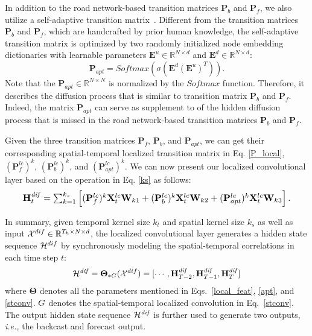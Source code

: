 \documentclass[sigconf, nonacm]{acmart}
\def\bb#1{\mathbb{#1}}
\def\b#1{\mathbf{#1}}
\def\cal#1{\mathcal{#1}}
\newcommand{\ie}{\textit{i.e.,}\xspace}
\begin{document}
In addition to the {\color{black}road network-based transition matrices $\mathbf{P}_b$ and $\mathbf{P}_f$}, we also utilize a self-adaptive {\color{black}transition} matrix~\cite{GWNet}.
{\color{black}
Different from the transition matrices $\mathbf{P}_b$ and $\mathbf{P}_f$, which are handcrafted by prior human knowledge, the self-adaptive transition matrix is optimized by two randomly initialized node embedding dictionaries with learnable parameters $\b{E}^u\in\mathbb{R}^{N\times d}$ and $\b{E}^d\in\mathbb{R}^{N\times d}$:
}
\begin{equation}
    \mathbf{P}_{\mathit{apt}}=\mathit{Softmax}(\sigma(\mathbf{E}^{d}(\mathbf{E}^{u})^T)).
    \label{apt}
\end{equation}
{\color{black}
Note that the $\mathbf{P}_{\mathit{apt}}\in\mathbb{R}^{N\times N}$ is normalized by the $\mathit{Softmax}$ function. 
Therefore, it describes the diffusion process that is similar to transition matrix $\mathbf{P}_b$ and $\mathbf{P}_f$.
Indeed, the matrix $\mathbf{P}_{\mathit{apt}}$ can serve as supplement to of the hidden diffusion process that is missed in the road network-based transition matrices $\mathbf{P}_b$ and $\mathbf{P}_f$.
}

{\color{black}
Given the three transition matrices $\mathbf{P}_f$, $\mathbf{P}_b$, and $\mathbf{P}_{apt}$, we can get their corresponding spatial-temporal localized transition matrix in Eq. \ref{P_local}, $(\mathbf{P}^{lc}_f)^k$, $(\mathbf{P}^{lc}_b)^k$, and $(\mathbf{P}^{lc}_{apt})^k$.
}
We can now present our localized {\color{black}convolutional} layer based on the operation in Eq. \ref{ks} as follows:
\begin{equation}
\resizebox{.92\hsize}{!}{$\mathbf{H}_{t}^{\mathit{dif}}=\sum_{k=1}^{k_s}  \left [(\mathbf{P}^{lc}_f)^k\mathbf{X}_t^{lc}\mathbf{W}_{k1}+(\mathbf{P}^{lc}_b)^k\mathbf{X}_t^{lc}\mathbf{W}_{k2}+{\color{black}(\mathbf{P}^{lc}_{apt})^{k}}\mathbf{X}_t^{lc}\mathbf{W}_{k3}\right ].$}
    \label{stconv}
\end{equation}

In summary, given temporal kernel size $k_t$ and spatial kernel size $k_s$ as well as input ${\color{black}\cal{X}}^{\color{black}dif}\in\bb{R}^{T_h\times N\times d}$, the localized {\color{black}convolutional} layer generates a hidden state sequence ${\color{black}\cal{H}^{\color{black}dif}}$ by synchronously modeling the spatial-temporal correlations in {\color{black}each time step $t$}:
\begin{equation}
    {\color{black}\mathcal{H}^{\mathit{\color{black}dif}}}=\mathbf{\Theta}_{*G}(\mathcal{X}^{\color{black}dif})=[\cdots, \mathbf{H}_{T-2}^{\mathit{\color{black}dif}},\mathbf{H}_{T-1}^{\mathit{\color{black}dif}},\mathbf{H}_{T}^{\mathit{\color{black}dif}}]
    \label{eq:hspa}
\end{equation}
where $\b{\Theta}$ denotes all the parameters mentioned in Eqs.~\ref{local_feat}, \ref{apt}, and \ref{stconv}.
{\color{black}$\*G$ denotes the spatial-temporal localized convolution in Eq.~\ref{stconv}.}
The output hidden state sequence ${\color{black}\cal{H}^{\mathit{\color{black}dif}}}$ is further used to generate two outputs, \ie the backcast and forecast output.
\end{document}
